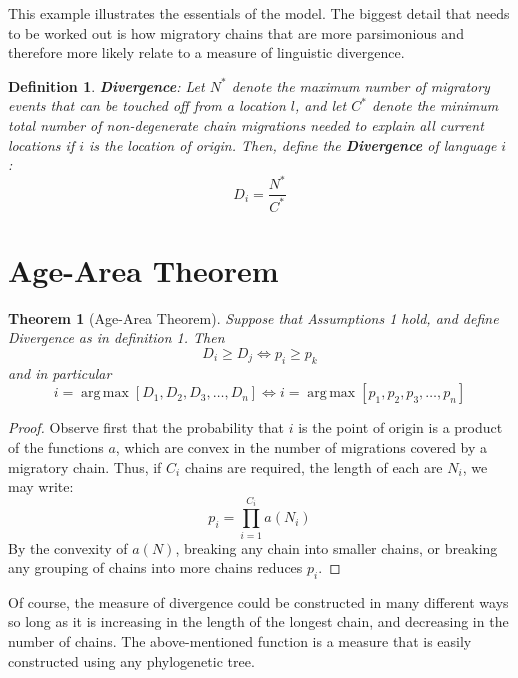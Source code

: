 \documentclass[11pt]{article}
\newtheorem{theorem}{Theorem}
\newtheorem{definition}{Definition}
\DeclareMathOperator*{\argmax}{arg\,max}
\begin{document}
This example illustrates the essentials of the model. The biggest detail that needs to be worked out is how migratory chains that are more parsimonious and therefore more likely relate to a measure of linguistic divergence. 

\begin{definition}{\textbf{Divergence}:}
Let $N^*$ denote the maximum number of migratory events that can be touched off from a location $l$, and let $C^*$ denote the minimum total number of non-degenerate chain migrations needed to explain all current locations if $i$ is the location of origin. Then, define the \textbf{Divergence} of language $i$ :
\begin{equation*}
D_i=\frac{N^*}{C^*}
\end{equation*}
\end{definition}


\section{ Age-Area Theorem}

\begin{theorem}[Age-Area Theorem]
Suppose that Assumptions 1 hold, and define Divergence as in definition 1. Then  
\begin{equation*}
D_i \geq D_j \Longleftrightarrow p_i\geq p_k
\end{equation*}
and in particular
\begin{equation*}
i=\argmax\left[D_1,D_2,D_3,\hdots,D_n\right] \Longleftrightarrow i=\argmax\left[p_1,p_2,p_3,\hdots,p_n\right]
\end{equation*}
\end{theorem}
\begin{proof}

Observe first that the probability that $i$ is the point of origin is a product of the functions $a$, which are convex in the number of migrations covered by a migratory chain. Thus, if $C_i$ chains are required, the length of each are $N_i$, we may write:
\begin{equation*}
p_i=\prod_{i=1}^{C_i} a(N_i)
\end{equation*} 
By the convexity of $a(N)$, breaking any chain into smaller chains, or breaking any grouping of chains into more chains reduces $p_i$.  
\end{proof} 

Of course, the measure of divergence could be constructed in many different ways so long as it is increasing in the length of the longest chain, and decreasing in the number of chains. The above-mentioned function is a measure that is easily constructed using any phylogenetic tree.  
\end{document}
